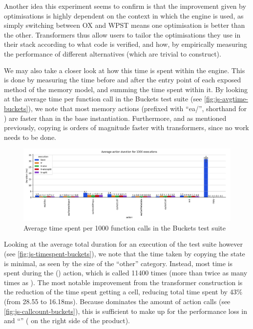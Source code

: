Another idea this experiment seems to confirm is that the improvement given by optimisations is highly dependent on the context in which the engine is used, as simply switching between OX and WPST means one optimisation is better than the other. Transformers thus allow users to tailor the optimisations they use in their stack according to what code is verified, and how, by empirically measuring the performance of different alternatives (which are trivial to construct).

We may also take a closer look at how this time is spent within the engine. This is done by measuring the time before and after the entry point of each exposed method of the memory model, and summing the time spent within it. By looking at the average time per function call in the Buckets test suite (see \autoref{fig:js-avgtime-buckets}), we note that most memory actions (prefixed with ``ea/'', shorthand for \execac) are faster than in the base instantiation. Furthermore, and as mentioned previously, copying is orders of magnitude faster with transformers, since no work needs to be done.

\begin{figure}
	\centering
	\includegraphics[width=\textwidth]{figures/js-avgtime-buckets.png}
	\caption{Average time spent per 1000 function calls in the Buckets test suite}
	\label{fig:js-avgtime-buckets}
\end{figure}

Looking at the average total duration for an execution of the test suite however (see \autoref{fig:js-timespent-buckets}), we note that the time taken by copying the state is minimal, as seen by the size of the ``other'' category. Instead, most time is spent during the \load{} () action, which is called 11400 times (more than twice as many times as \store{}). The most notable improvement from the transformer construction is the reduction of the time spent getting a cell, reducing total time spent by 43\% (from 28.55 to 16.18ms). Because \load{} dominates the amount of action calls (see \autoref{fig:js-callcount-buckets}), this is sufficient to make up for the performance loss in \store{} and ``'' (\load{} on the right side of the product).

